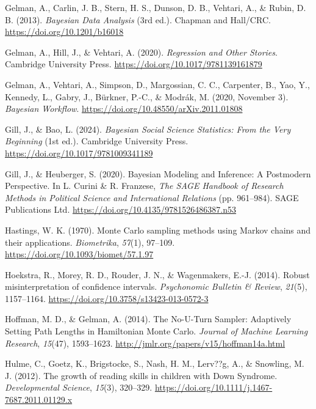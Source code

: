 \documentclass[
  11pt,
  a4paper,
]{report}
\newlength{\cslhangindent}
\newenvironment{CSLReferences}[2] %
 {\begin{list}{}{%
  \setlength{\itemindent}{0pt}
  \setlength{\leftmargin}{0pt}
  \setlength{\parsep}{0pt}
  \ifodd #1
   \setlength{\leftmargin}{\cslhangindent}
   \setlength{\itemindent}{-1\cslhangindent}
  \fi
  \setlength{\itemsep}{#2\baselineskip}}}
 {\end{list}}
\begin{document}
\begin{CSLReferences}{1}{0}
Gelman, A., Carlin, J. B., Stern, H. S., Dunson, D. B., Vehtari, A., \&
Rubin, D. B. (2013). \emph{Bayesian {Data Analysis}} (3rd ed.). {Chapman
and Hall/CRC}. \url{https://doi.org/10.1201/b16018}

Gelman, A., Hill, J., \& Vehtari, A. (2020). \emph{Regression and {Other
Stories}}. Cambridge University Press.
\url{https://doi.org/10.1017/9781139161879}

Gelman, A., Vehtari, A., Simpson, D., Margossian, C. C., Carpenter, B.,
Yao, Y., Kennedy, L., Gabry, J., Bürkner, P.-C., \& Modrák, M. (2020,
November 3). \emph{Bayesian {Workflow}}.
\url{https://doi.org/10.48550/arXiv.2011.01808}

Gill, J., \& Bao, L. (2024). \emph{Bayesian {Social Science Statistics}:
{From} the {Very Beginning}} (1st ed.). Cambridge University Press.
\url{https://doi.org/10.1017/9781009341189}

Gill, J., \& Heuberger, S. (2020). Bayesian {Modeling} and {Inference}:
{A Postmodern Perspective}. In L. Curini \& R. Franzese, \emph{The {SAGE
Handbook} of {Research Methods} in {Political Science} and
{International Relations}} (pp. 961--984). SAGE Publications Ltd.
\url{https://doi.org/10.4135/9781526486387.n53}

Hastings, W. K. (1970). Monte {Carlo} sampling methods using {Markov}
chains and their applications. \emph{Biometrika}, \emph{57}(1), 97--109.
\url{https://doi.org/10.1093/biomet/57.1.97}

Hoekstra, R., Morey, R. D., Rouder, J. N., \& Wagenmakers, E.-J. (2014).
Robust misinterpretation of confidence intervals. \emph{Psychonomic
Bulletin \& Review}, \emph{21}(5), 1157--1164.
\url{https://doi.org/10.3758/s13423-013-0572-3}

Hoffman, M. D., \& Gelman, A. (2014). The {No-U-Turn Sampler}:
{Adaptively Setting Path Lengths} in {Hamiltonian Monte Carlo}.
\emph{Journal of Machine Learning Research}, \emph{15}(47), 1593--1623.
\url{http://jmlr.org/papers/v15/hoffman14a.html}

Hulme, C., Goetz, K., Brigstocke, S., Nash, H. M., Lerv??g, A., \&
Snowling, M. J. (2012). The growth of reading skills in children with
{Down Syndrome}. \emph{Developmental Science}, \emph{15}(3), 320--329.
\url{https://doi.org/10.1111/j.1467-7687.2011.01129.x}


\end{CSLReferences}
\end{document}
